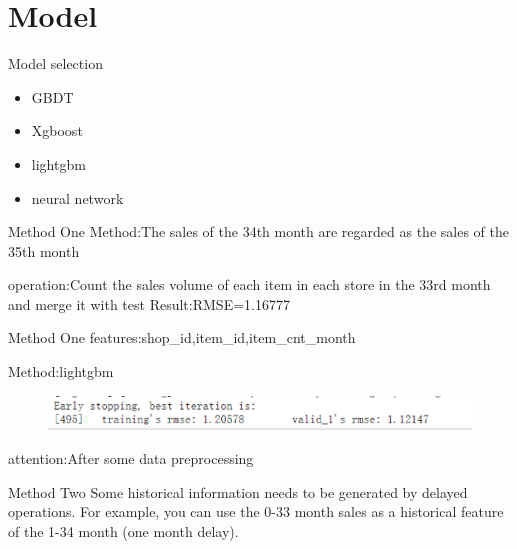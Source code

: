 \documentclass[
 size=14pt,
 paper=smartboard,  %
 mode=present, 		%
 display=slides, 	%
 style=tuliplab,  	%
 pauseslide,
 fleqn,leqno]{powerdot}
\begin{document}
\section{Model}


\begin{slide}[toc=,bm=]{Model selection}
  \begin{itemize}
    \item GBDT
    \item Xgboost
    \item lightgbm
    \item neural network
  \end{itemize}
\end{slide}


\begin{slide}[toc=,bm=]{Method One}
  Method:The sales of the 34th month are regarded as the sales of the 35th month\par
  operation:Count the sales volume of each item in each store in the 33rd month and merge it with test
  Result:RMSE=1.16777
\end{slide}


\begin{slide}[toc=,bm=]{Method One}
  features:shop_id,item_id,item_cnt_month\par
  Method:lightgbm
  \begin{figure}
    \includegraphics[scale=0.5]{picture/data_14.eps}
  \end{figure}
  attention:After some data preprocessing
\end{slide}

\begin{slide}[toc=,bm=]{Method Two}
  Some historical information needs to be generated by delayed operations. For example, you can use the 0-33 month sales as a historical feature of the 1-34 month (one month delay).
\end{slide}
\end{document}
